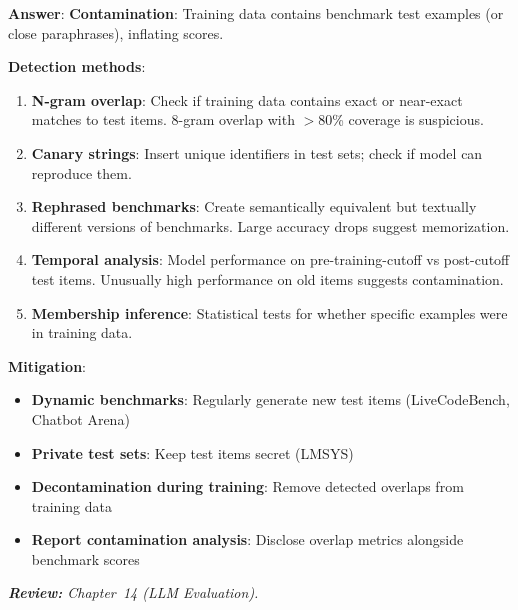 \begin{questionbox}
\textbf{Answer}: \textbf{Contamination}: Training data contains benchmark test examples (or close paraphrases), inflating scores.

\textbf{Detection methods}:

\begin{enumerate}
  \item \textbf{N-gram overlap}: Check if training data contains exact or near-exact matches to test items. 8-gram overlap with $>$80\% coverage is suspicious.
  \item \textbf{Canary strings}: Insert unique identifiers in test sets; check if model can reproduce them.
  \item \textbf{Rephrased benchmarks}: Create semantically equivalent but textually different versions of benchmarks. Large accuracy drops suggest memorization.
  \item \textbf{Temporal analysis}: Model performance on pre-training-cutoff vs post-cutoff test items. Unusually high performance on old items suggests contamination.
  \item \textbf{Membership inference}: Statistical tests for whether specific examples were in training data.
\end{enumerate}

\textbf{Mitigation}:

\begin{itemize}
  \item \textbf{Dynamic benchmarks}: Regularly generate new test items (LiveCodeBench, Chatbot Arena)
  \item \textbf{Private test sets}: Keep test items secret (LMSYS)
  \item \textbf{Decontamination during training}: Remove detected overlaps from training data
  \item \textbf{Report contamination analysis}: Disclose overlap metrics alongside benchmark scores
\end{itemize}

\emph{\textbf{Review:} Chapter~14 (LLM Evaluation).}
\end{questionbox}

